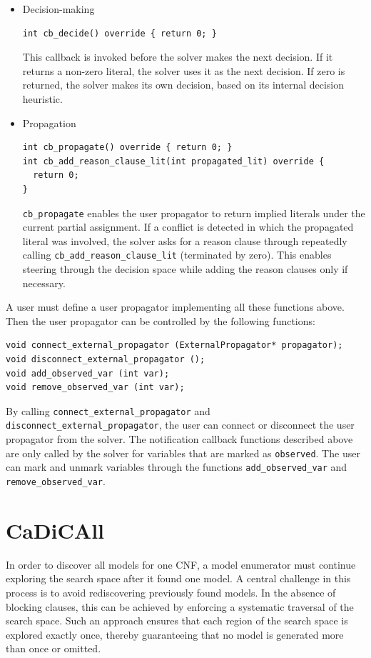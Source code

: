 \documentclass[12pt,a4paper]{article}
\begin{document}
\begin{itemize}
\item Decision-making
\begin{verbatim}
int cb_decide() override { return 0; }
\end{verbatim}
  This callback is invoked before the solver makes the next decision. If it returns a non-zero literal, the solver uses it as the next decision. If zero is returned, the solver makes its own decision, based on its internal decision heuristic.

\item Propagation
\begin{verbatim}
int cb_propagate() override { return 0; }
int cb_add_reason_clause_lit(int propagated_lit) override {
  return 0;
}
\end{verbatim}
  \verb|cb_propagate| enables the user propagator to return implied literals under the current partial assignment. If a conflict is detected in which the propagated literal was involved, the solver asks for a reason clause through repeatedly calling \verb|cb_add_reason_clause_lit| (terminated by zero). This enables steering through the decision space while adding the reason clauses only if necessary.
\end{itemize}

A user must define a user propagator implementing all these functions above. Then the user propagator can be controlled by the following functions:

\begin{verbatim}
void connect_external_propagator (ExternalPropagator* propagator);
void disconnect_external_propagator ();
void add_observed_var (int var);
void remove_observed_var (int var);
\end{verbatim}

By calling \verb|connect_external_propagator| and \verb|disconnect_external_propagator|, the user can connect or disconnect the user propagator from the solver. The notification callback functions described above are only called by the solver for variables that are marked as \verb|observed|. The user can mark and unmark variables through the functions \verb|add_observed_var| and \verb|remove_observed_var|.

\newpage

\section{CaDiCAll}
\label{sec:cadicall}

In order to discover all models for one CNF, a model enumerator must continue exploring the search space after it found one model. A central challenge in this process is to avoid rediscovering previously found models. In the absence of blocking clauses, this can be achieved by enforcing a systematic traversal of the search space. Such an approach ensures that each region of the search space is explored exactly once, thereby guaranteeing that no model is generated more than once or omitted.
\end{document}
